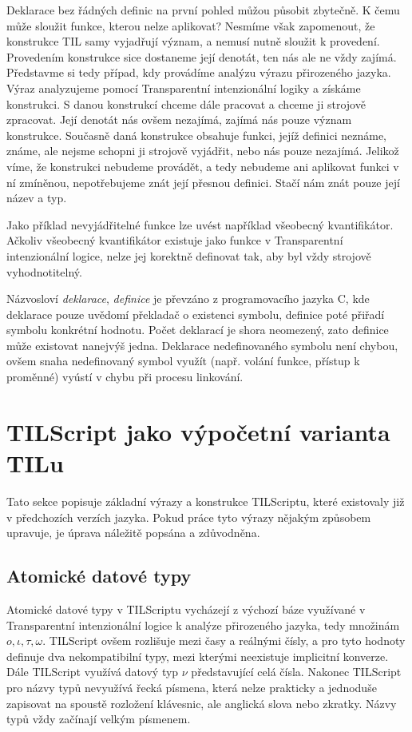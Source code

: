 Deklarace bez řádných definic na první pohled můžou působit zbytečně. K čemu může sloužit funkce,
kterou nelze aplikovat? Nesmíme však zapomenout, že konstrukce TIL samy vyjadřují význam, a nemusí
nutně sloužit k provedení. Provedením konstrukce sice dostaneme její denotát, ten nás ale ne vždy
zajímá. Představme si tedy případ, kdy provádíme analýzu výrazu přirozeného jazyka. Výraz
analyzujeme pomocí Transparentní intenzionální logiky a získáme konstrukci. S danou konstrukcí
chceme dále pracovat a chceme ji strojově zpracovat. Její denotát nás ovšem nezajímá, zajímá nás
pouze význam konstrukce. Současně daná konstrukce obsahuje funkci, jejíž definici neznáme, známe,
ale nejsme schopni ji strojově vyjádřit, nebo nás pouze nezajímá. Jelikož víme, že konstrukci
nebudeme provádět, a tedy nebudeme ani aplikovat funkci v ní zmíněnou, nepotřebujeme znát její
přesnou definici. Stačí nám znát pouze její název a typ.

Jako příklad nevyjádřitelné funkce lze uvést například všeobecný kvantifikátor. Ačkoliv všeobecný
kvantifikátor existuje jako funkce v Transparentní intenzionální logice, nelze jej korektně
definovat tak, aby byl vždy strojově vyhodnotitelný.

Názvosloví \textit{deklarace}, \textit{definice} je převzáno z programovacího jazyka C, kde
deklarace pouze uvědomí překladač o existenci symbolu, definice poté přiřadí symbolu konkrétní
hodnotu. Počet deklarací je shora neomezený, zato definice může existovat nanejvýš jedna. Deklarace
nedefinovaného symbolu není chybou, ovšem snaha nedefinovaný symbol využít (např. volání funkce,
přístup k proměnné) vyústí v chybu při procesu linkování.

\section{TILScript jako výpočetní varianta TILu}

Tato sekce popisuje základní výrazy a konstrukce TILScriptu, které existovaly již v předchozích
verzích jazyka. Pokud práce tyto výrazy nějakým způsobem upravuje, je úprava náležitě popsána
a zdůvodněna.

\subsection{Atomické datové typy}

Atomické datové typy v TILScriptu vycházejí z výchozí báze využívané v Transparentní intenzionální
logice k analýze přirozeného jazyka, tedy množinám ${o, \iota, \tau, \omega}$. TILScript ovšem
rozlišuje mezi časy a reálnými čísly, a pro tyto hodnoty definuje dva nekompatibilní typy, mezi
kterými neexistuje implicitní konverze. Dále TILScript využívá datový typ $\nu$ představující celá
čísla. Nakonec TILScript pro názvy typů nevyužívá řecká písmena, která nelze prakticky a jednoduše
zapisovat na spoustě rozložení klávesnic, ale anglická slova nebo zkratky. Názvy typů vždy začínají
velkým písmenem.

